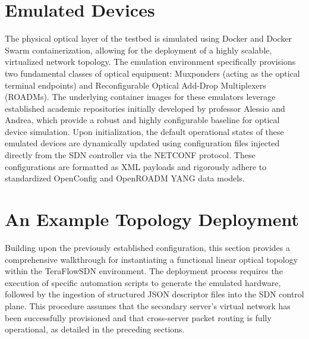 \section{Emulated Devices}
The physical optical layer of the testbed is simulated using Docker and Docker Swarm containerization, allowing for the deployment of a highly scalable, virtualized network topology. The emulation environment specifically provisions two fundamental classes of optical equipment: Muxponders (acting as the optical terminal endpoints) and Reconfigurable Optical Add-Drop Multiplexers (ROADMs). The underlying container images for these emulators leverage established academic repositories initially developed by professor Alessio and Andrea, which provide a robust and highly configurable baseline for optical device simulation. Upon initialization, the default operational states of these emulated devices are dynamically updated using configuration files injected directly from the SDN controller via the NETCONF protocol. These configurations are formatted as XML payloads and rigorously adhere to standardized OpenConfig and OpenROADM YANG data models.
\section{An Example Topology Deployment}
Building upon the previously established configuration, this section provides a comprehensive walkthrough for instantiating a functional linear optical topology within the TeraFlowSDN environment. The deployment process requires the execution of specific automation scripts to generate the emulated hardware, followed by the ingestion of structured JSON descriptor files into the SDN control plane. This procedure assumes that the secondary server's virtual network has been successfully provisioned and that cross-server packet routing is fully operational, as detailed in the preceding sections.

